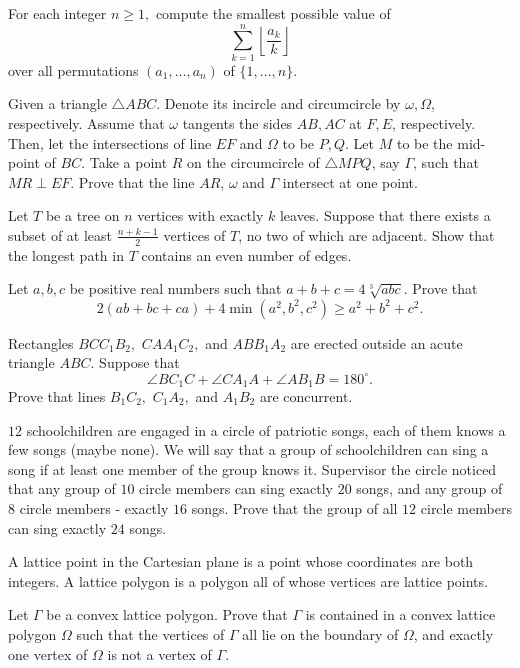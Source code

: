 \documentclass[11pt]{scrartcl}
\begin{document}
\begin{problem}[161342796381450]
For each integer $n\ge 1,$ compute the smallest possible value of\[\sum_{k=1}^{n}\left\lfloor\frac{a_k}{k}\right\rfloor\]over all permutations $(a_1,\dots,a_n)$ of $\{1,\dots,n\}.$
\end{problem}
\begin{problem}[1965233157265405983]
Given a triangle $ \triangle{ABC} $. Denote its incircle and circumcircle by $ \omega, \Omega $, respectively. Assume that $ \omega $ tangents the sides $ AB, AC $ at $ F, E $, respectively. Then, let the intersections of line $ EF $ and $ \Omega $ to be $ P,Q $. Let $ M $ to be the mid-point of $ BC $. Take a point $ R $ on the circumcircle of $ \triangle{MPQ} $, say $ \Gamma $, such that $ MR \perp EF $. Prove that the line $ AR $, $ \omega $ and $ \Gamma $ intersect at one point.
\end{problem}
\begin{problem}[521969466382456]
	Let $T$ be a tree on $n$ vertices with exactly $k$ leaves. Suppose that there exists a subset of at least $\frac{n+k-1}{2}$ vertices of $T$, no two of which are adjacent. Show that the longest path in $T$ contains an even number of edges. 
\end{problem}
\begin{problem}[329519083206921]
Let \(a,b,c\) be positive real numbers such that \(a+b+c=4\sqrt[3]{abc}\). Prove that\[2(ab+bc+ca)+4\min(a^2,b^2,c^2)\ge a^2+b^2+c^2.\]
\end{problem}
\begin{problem}[942225649898797]
Rectangles $BCC_1B_2,$ $CAA_1C_2,$ and $ABB_1A_2$ are erected outside an acute triangle $ABC.$ Suppose that\[\angle BC_1C+\angle CA_1A+\angle AB_1B=180^{\circ}.\]Prove that lines $B_1C_2,$ $C_1A_2,$ and $A_1B_2$ are concurrent.
\end{problem}
\begin{problem}[8024569764169071557]
$12$ schoolchildren are engaged in a circle of patriotic songs, each of them knows a few songs (maybe none). We will say that a group of schoolchildren can sing a song if at least one member of the group knows it. Supervisor the circle noticed that any group of $10$ circle members can sing exactly $20$ songs, and any group of $8$ circle members - exactly $16$ songs. Prove that the group of all $12$ circle members can sing exactly $24$ songs.
\end{problem}
\begin{problem}[5562895031008938211]
A lattice point in the Cartesian plane is a point whose coordinates are both integers. A lattice polygon is a polygon all of whose vertices are lattice points.

Let $\Gamma$ be a convex lattice polygon. Prove that $\Gamma$ is contained in a convex lattice polygon $\Omega$ such that the vertices of $\Gamma$ all lie on the boundary of $\Omega$, and exactly one vertex of $\Omega$ is not a vertex of $\Gamma$.
\end{problem}
\end{document}
